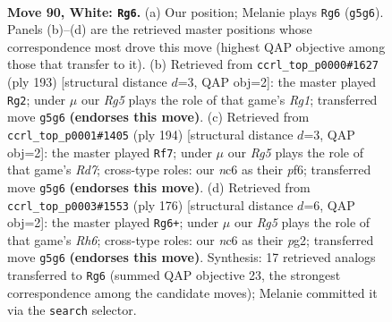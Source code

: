 \documentclass[11pt]{article}
\begin{document}
\clearpage

\begin{figure}[p]\centering
\begin{subfigure}{0.46\textwidth}\centering
\resizebox{\linewidth}{!}{%
\newchessgame
\chessboard[
  setfen={5k2/8/P1n5/6R1/8/7r/5K2/8 w - - 7 90},
  showmover=false,
  pgfstyle=straightmove, color=movearrow, markmove={g5-g6}
]}
\caption{}
\end{subfigure}\hfill
\begin{subfigure}{0.46\textwidth}\centering
\resizebox{\linewidth}{!}{%
\newchessgame
\chessboard[
  setfen={6r1/8/5K2/8/3k4/p6R/N7/8 b - - 4 97},
  showmover=false,
  pgfstyle=straightmove, color=movearrow, markmove={g8-g2}
]}
\caption{}
\end{subfigure}
\\[4pt]
\begin{subfigure}{0.46\textwidth}\centering
\resizebox{\linewidth}{!}{%
\newchessgame
\chessboard[
  setfen={8/3R4/5p1k/5P2/1r6/5K2/8/8 w - - 8 98},
  showmover=false,
  pgfstyle=straightmove, color=movearrow, markmove={d7-f7}
]}
\caption{}
\end{subfigure}\hfill
\begin{subfigure}{0.46\textwidth}\centering
\resizebox{\linewidth}{!}{%
\newchessgame
\chessboard[
  setfen={8/2P5/7R/8/3K2k1/8/6p1/2r5 w - - 7 89},
  showmover=false,
  pgfstyle=straightmove, color=movearrow, markmove={h6-g6}
]}
\caption{}
\end{subfigure}
\caption{\textbf{Move 90, White: \texttt{Rg6}.} (a) Our position; Melanie plays \texttt{Rg6} (\texttt{g5g6}). Panels (b)--(d) are the retrieved master positions whose correspondence most drove this move (highest QAP objective among those that transfer to it). (b) Retrieved from \texttt{ccrl\_top\_p0000\#1627} (ply 193) [structural distance $d$=3, QAP obj=2]: the master played \texttt{Rg2}; under $\mu$ our \emph{Rg5} plays the role of that game's \emph{Rg1}; transferred move \texttt{g5g6} \textbf{(endorses this move)}. (c) Retrieved from \texttt{ccrl\_top\_p0001\#1405} (ply 194) [structural distance $d$=3, QAP obj=2]: the master played \texttt{Rf7}; under $\mu$ our \emph{Rg5} plays the role of that game's \emph{Rd7}; cross-type roles: our \emph{n}c6 as their \emph{p}f6; transferred move \texttt{g5g6} \textbf{(endorses this move)}. (d) Retrieved from \texttt{ccrl\_top\_p0003\#1553} (ply 176) [structural distance $d$=6, QAP obj=2]: the master played \texttt{Rg6+}; under $\mu$ our \emph{Rg5} plays the role of that game's \emph{Rh6}; cross-type roles: our \emph{n}c6 as their \emph{p}g2; transferred move \texttt{g5g6} \textbf{(endorses this move)}. Synthesis: 17 retrieved analogs transferred to \texttt{Rg6} (summed QAP objective 23, the strongest correspondence among the candidate moves); Melanie committed it via the \texttt{search} selector.}
\label{fig:thought-m178}
\end{figure}
\end{document}
